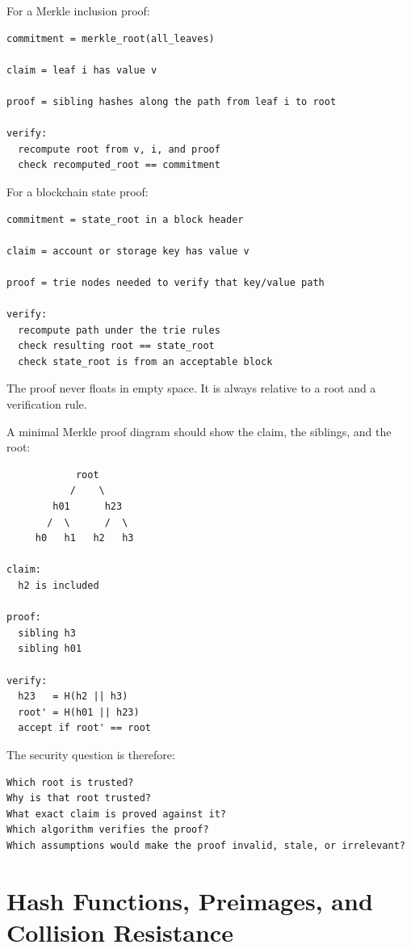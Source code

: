 For a Merkle inclusion proof:

\begin{lstlisting}
commitment = merkle_root(all_leaves)

claim = leaf i has value v

proof = sibling hashes along the path from leaf i to root

verify:
  recompute root from v, i, and proof
  check recomputed_root == commitment
\end{lstlisting}

For a blockchain state proof:

\begin{lstlisting}
commitment = state_root in a block header

claim = account or storage key has value v

proof = trie nodes needed to verify that key/value path

verify:
  recompute path under the trie rules
  check resulting root == state_root
  check state_root is from an acceptable block
\end{lstlisting}

The proof never floats in empty space. It is always relative to a root
and a verification rule.


A minimal Merkle proof diagram should show the claim, the siblings, and the root:

\begin{lstlisting}
            root
           /    \
        h01      h23
       /  \      /  \
     h0   h1   h2   h3

claim:
  h2 is included

proof:
  sibling h3
  sibling h01

verify:
  h23   = H(h2 || h3)
  root' = H(h01 || h23)
  accept if root' == root
\end{lstlisting}

The security question is therefore:

\begin{lstlisting}
Which root is trusted?
Why is that root trusted?
What exact claim is proved against it?
Which algorithm verifies the proof?
Which assumptions would make the proof invalid, stale, or irrelevant?
\end{lstlisting}

\section{Hash Functions, Preimages, and Collision Resistance}

